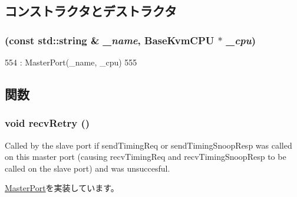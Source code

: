 \subsection{コンストラクタとデストラクタ}
\hypertarget{classBaseKvmCPU_1_1KVMCpuPort_ab931237cb0e359b959dda61ba1bcc011}{
\subsubsection[{KVMCpuPort}]{ (const std::string \& {\em \_\-name}, \/  {\bf BaseKvmCPU} $\ast$ {\em \_\-cpu})}}
\label{classBaseKvmCPU_1_1KVMCpuPort_ab931237cb0e359b959dda61ba1bcc011}



\begin{DoxyCode}
554             : MasterPort(_name, _cpu)
555         { }
\end{DoxyCode}


\subsection{関数}
\hypertarget{classBaseKvmCPU_1_1KVMCpuPort_a29cb5a4f98063ce6e9210eacbdb35298}{
\subsubsection[{recvRetry}]{\setlength{\rightskip}{0pt plus 5cm}void recvRetry ()}}
\label{classBaseKvmCPU_1_1KVMCpuPort_a29cb5a4f98063ce6e9210eacbdb35298}
Called by the slave port if sendTimingReq or sendTimingSnoopResp was called on this master port (causing recvTimingReq and recvTimingSnoopResp to be called on the slave port) and was unsuccesful. 

\hyperlink{classMasterPort_ac1ccc3bcf7ebabb20b57fab99b2be5b0}{MasterPort}を実装しています。


